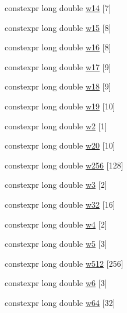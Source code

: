 \begin{DoxyCompactItemize}
\item 
constexpr long double \hyperlink{namespace____gnu__cxx_a5e5dfdb3ae5bc8ccf19b1ca2cc0f7066}{w14} \mbox{[}7\mbox{]}
\item 
constexpr long double \hyperlink{namespace____gnu__cxx_ab3e1c2f759eb0240f8cd080176d2b368}{w15} \mbox{[}8\mbox{]}
\item 
constexpr long double \hyperlink{namespace____gnu__cxx_a8ed7eb855a47e600a4fcf95a7fe50017}{w16} \mbox{[}8\mbox{]}
\item 
constexpr long double \hyperlink{namespace____gnu__cxx_ae9200716f406eb77f0a164d8a525f768}{w17} \mbox{[}9\mbox{]}
\item 
constexpr long double \hyperlink{namespace____gnu__cxx_aed43747e0c3d8ffbdc4c76d781a6857d}{w18} \mbox{[}9\mbox{]}
\item 
constexpr long double \hyperlink{namespace____gnu__cxx_acad67ec3f8cfd008f39c2d7aa8532445}{w19} \mbox{[}10\mbox{]}
\item 
constexpr long double \hyperlink{namespace____gnu__cxx_ad1181895596ae9fdca61c42930828ed1}{w2} \mbox{[}1\mbox{]}
\item 
constexpr long double \hyperlink{namespace____gnu__cxx_aa6d5b9a2b5539e57323b38b81d52795f}{w20} \mbox{[}10\mbox{]}
\item 
constexpr long double \hyperlink{namespace____gnu__cxx_a1b898eb597628366c011fc46079c2f48}{w256} \mbox{[}128\mbox{]}
\item 
constexpr long double \hyperlink{namespace____gnu__cxx_af8ad07ea55d0acbeba333a42dfd1c172}{w3} \mbox{[}2\mbox{]}
\item 
constexpr long double \hyperlink{namespace____gnu__cxx_a50cb4dfc5cbb269dc8a2d6ef18436008}{w32} \mbox{[}16\mbox{]}
\item 
constexpr long double \hyperlink{namespace____gnu__cxx_aed9d2cb808e1d273a3d11b6e1a3ac3f6}{w4} \mbox{[}2\mbox{]}
\item 
constexpr long double \hyperlink{namespace____gnu__cxx_ad45573427e2170859a26ed81066c8858}{w5} \mbox{[}3\mbox{]}
\item 
constexpr long double \hyperlink{namespace____gnu__cxx_aa0b9e3a86cfbee76c8d296f2ccdc968b}{w512} \mbox{[}256\mbox{]}
\item 
constexpr long double \hyperlink{namespace____gnu__cxx_a28b2300f8b7add692619c932d20498aa}{w6} \mbox{[}3\mbox{]}
\item 
constexpr long double \hyperlink{namespace____gnu__cxx_aee2ad0b2f98e9f3210e7c3f3cedf2b3a}{w64} \mbox{[}32\mbox{]}
\item 

\end{DoxyCompactItemize}
